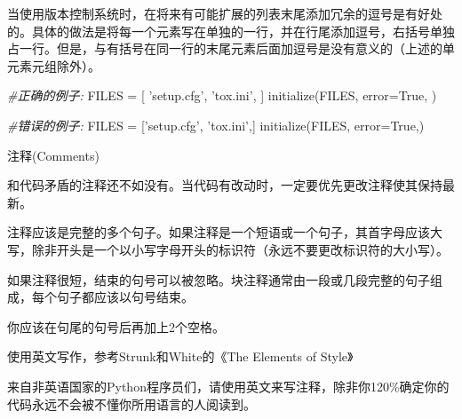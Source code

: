 \documentclass[ignorenonframetext,9pt]{beamer}
\newenvironment{Shaded}{}{}
\newcommand{\CommentTok}[1]{\textcolor[rgb]{0.38,0.63,0.69}{\textit{#1}}}
\newcommand{\NormalTok}[1]{#1}
\newcommand{\OperatorTok}[1]{\textcolor[rgb]{0.40,0.40,0.40}{#1}}
\newcommand{\StringTok}[1]{\textcolor[rgb]{0.25,0.44,0.63}{#1}}
\newcommand{\VariableTok}[1]{\textcolor[rgb]{0.10,0.09,0.49}{#1}}
\begin{document}
\begin{frame}[fragile]

当使用版本控制系统时，在将来有可能扩展的列表末尾添加冗余的逗号是有好处的。具体的做法是将每一个元素写在单独的一行，并在行尾添加逗号，右括号单独占一行。但是，与有括号在同一行的末尾元素后面加逗号是没有意义的（上述的单元素元组除外）。

\begin{Shaded}
\begin{Highlighting}[]
\CommentTok{#正确的例子:}
\NormalTok{FILES }\OperatorTok{=}\NormalTok{ [}
    \StringTok{'setup.cfg'}\NormalTok{,}
    \StringTok{'tox.ini'}\NormalTok{,}
\NormalTok{    ]}
\NormalTok{initialize(FILES,}
\NormalTok{           error}\OperatorTok{=}\VariableTok{True}\NormalTok{,}
\NormalTok{           )}

\CommentTok{#错误的例子:}
\NormalTok{FILES }\OperatorTok{=}\NormalTok{ [}\StringTok{'setup.cfg'}\NormalTok{, }\StringTok{'tox.ini'}\NormalTok{,]}
\NormalTok{initialize(FILES, error}\OperatorTok{=}\VariableTok{True}\NormalTok{,)}
\end{Highlighting}
\end{Shaded}

\end{frame}

\begin{frame}{注释(Comments)}
\protect\hypertarget{ux6ce8ux91cacomments}{}

和代码矛盾的注释还不如没有。当代码有改动时，一定要优先更改注释使其保持最新。

注释应该是完整的多个句子。如果注释是一个短语或一个句子，其首字母应该大写，除非开头是一个以小写字母开头的标识符（永远不要更改标识符的大小写）。

如果注释很短，结束的句号可以被忽略。块注释通常由一段或几段完整的句子组成，每个句子都应该以句号结束。

你应该在句尾的句号后再加上2个空格。

使用英文写作，参考Strunk和White的《The Elements of Style》

来自非英语国家的Python程序员们，请使用英文来写注释，除非你120\%确定你的代码永远不会被不懂你所用语言的人阅读到。

\end{frame}
\end{document}
